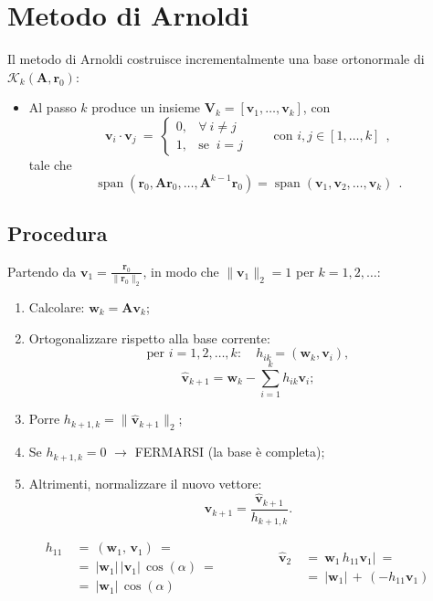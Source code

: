\section{Metodo di Arnoldi}
Il metodo di Arnoldi costruisce incrementalmente una base ortonormale di $\mathcal{K}_k(\mathbf{A},\mathbf{r}_0)$:
\begin{itemize}
	\item Al passo $k$ produce un insieme $\mathbf{V}_k = [\mathbf{v}_1, \ldots, \mathbf{v}_k]$, con
	\[
	\mathbf{v}_i \cdot \mathbf{v}_j\ =\ \begin{cases}
		0, & \forall\ i \neq j \\
		1, & \text{se }\ i = j
	\end{cases} \qquad \text{con } i, j \in [1, \dots, k]\ \ , 
	\]
	tale che
	\[
	\operatorname{span}(\mathbf{r}_0, \mathbf{A} \mathbf{r}_0, \dots, \mathbf{A}^{k-1} \mathbf{r}_0) = \operatorname{span}(\mathbf{v}_1, \mathbf{v}_2, \dots, \mathbf{v}_k)\ \ .
	\]
\end{itemize}

\subsection{Procedura}
Partendo da $\mathbf{v}_1 = \frac{\mathbf{r}_0}{\|\mathbf{r}_0\|_2}$, in modo che $\|\mathbf v_1\|_2=1$ per $k = 1, 2, \ldots$:
\begin{enumerate}
	\item Calcolare: $\mathbf{w}_k = \mathbf{A}\mathbf{v}_k$;
	\item Ortogonalizzare rispetto alla base corrente:
	\[
	\text{per } i = 1, 2, \dots, k: \quad h_{ik} = (\mathbf{w}_k, \mathbf{v}_i), \tag{15}
	\]
	\[
	\hat{\mathbf{v}}_{k+1} = \mathbf{w}_k - \sum_{i=1}^{k} h_{ik} \mathbf{v}_i; \tag{16}
	\]
	\item Porre $h_{k+1,k} = \|\hat{\mathbf{v}}_{k+1}\|_2$;
	\item Se $h_{k+1,k} = 0$ $\rightarrow$  FERMARSI (la base è completa);
	\item Altrimenti, normalizzare il nuovo vettore:
	\[
	\mathbf{v}_{k+1} = \frac{\hat{\mathbf{v}}_{k+1}}{h_{k+1,k}}. \tag{17}
	\]
\end{enumerate}

\[
\begin{aligned}
	h_{11}\ &=\ (\mathbf w_1,\,\mathbf v_1)\ =\\
	&=\ |\mathbf w_1|\, |\mathbf v_1|\, \cos(\alpha)\ =\\
	&=\ |\mathbf w_1|\, \cos(\alpha)
\end{aligned}
\qquad \qquad
\begin{aligned}
	\hat{\mathbf v}_2\ &=\ \mathbf w_1\, h_{11} \mathbf v_1|\ =\\
	&=\ |\mathbf w_1|\, +\, (-h_{11}\mathbf v_1)
\end{aligned}
\]

